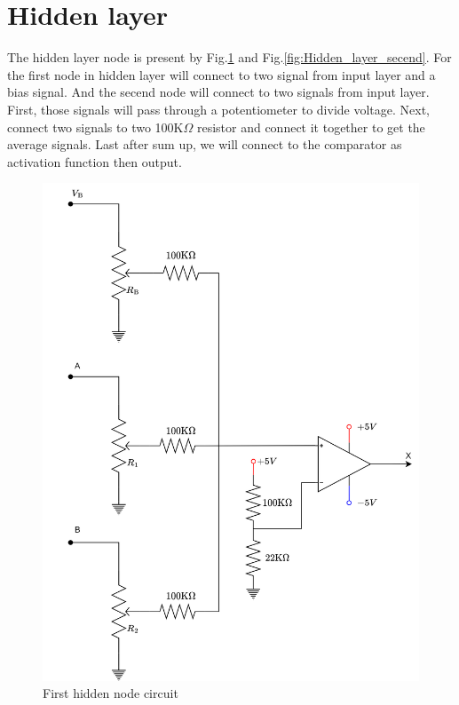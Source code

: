 \documentclass[a4paper, 12pt, AutoFakeBold]{report}
\newcommand{\figref}[1]{Fig.\ref{#1}}
\begin{document}
    \section{Hidden layer}
    The hidden layer node is present by \figref{fig:Hidden_layer_first} and \figref{fig:Hidden_layer_secend}. For the first node in hidden layer will connect to two signal from input layer and a bias signal. And the secend node will connect to two signals from input layer. First, those signals will pass through a potentiometer to divide voltage. Next, connect two signals to two 100K$\Omega$ resistor and connect it together to get the average signals. Last after sum up, we will connect to the comparator as activation function then output.
    \begin{figure}[H]
        \centering
        \includegraphics[scale=.2]{figs/Hidden_layer_first.png}
        \caption{First hidden node circuit}
        \label{fig:Hidden_layer_first}
    \end{figure}
\end{document}
